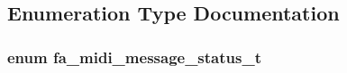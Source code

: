 \subsection{Enumeration Type Documentation}
\hypertarget{group___fa_midi_message_gaf34878eefb2ec676b7894176528d5b05}{
\subsubsection[{fa\-\_\-midi\-\_\-message\-\_\-status\-\_\-t}]{\setlength{\rightskip}{0pt plus 5cm}enum {\bf fa\-\_\-midi\-\_\-message\-\_\-status\-\_\-t}}}\label{group___fa_midi_message_gaf34878eefb2ec676b7894176528d5b05}
